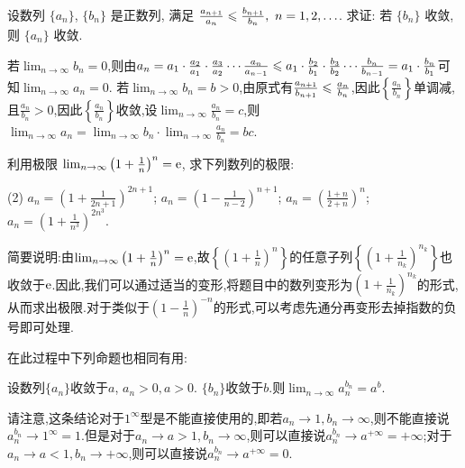 \begin{exercise}[1.2.21]
    设数列 $\{a_n\}$, $\{b_n\}$ 是正数列, 满足 $\frac{a_{n+1}}{a_n} \leqslant \frac{b_{n+1}}{b_n}, \ n=1, 2, \ldots$. 求证: 若 $\{b_n\}$ 收敛, 则 $\{a_n\}$ 收敛.
\end{exercise}

\begin{solution}
    若$\lim_{n\to\infty} b_n = 0$,则由$a_n = a_1 \cdot \frac{a_2}{a_1} \cdot \frac{a_3}{a_2} \cdots \frac{a_n}{a_{n-1}} \leqslant a_1 \cdot \frac{b_2}{b_1} \cdot \frac{b_3}{b_2} \cdots \frac{b_n}{b_{n-1}} = a_1 \cdot \frac{b_n}{b_1}$可知$\lim_{n\to\infty} a_n = 0$.
    若$\lim_{n\to\infty} b_n = b > 0$,由原式有$\frac{a_{n+1}}{b_{n+1}} \leqslant \frac{a_n}{b_n}$,因此$\left\{ \frac{a_n}{b_n} \right\}$单调减,且$\frac{a_n}{b_n} > 0$,因此$\left\{ \frac{a_n}{b_n} \right\}$收敛,设$\lim_{n\to\infty} \frac{a_n}{b_n} = c$,则$\lim_{n\to\infty} a_n = \lim_{n\to\infty} b_n \cdot \lim_{n\to\infty} \frac{a_n}{b_n} = bc$.
\end{solution}

\begin{exercise}[1.2.22]
    利用极限 $\lim_{n\to\infty} \left(1 + \frac{1}{n}\right)^n = \mathrm{e}$, 求下列数列的极限:
    \begin{tasks}[label=(\arabic*)](2)
        \task $a_n = \left(1 + \frac{1}{2n+1}\right)^{2n+1}$;
        \task $a_n = \left(1 - \frac{1}{n-2}\right)^{n+1}$;
        \task $a_n = \left(\frac{1+n}{2+n}\right)^{n}$;
        \task $a_n = \left(1 + \frac{1}{n^3}\right)^{2n^3}$.
    \end{tasks}
\end{exercise}

简要说明:由$\lim_{n\to\infty} \left(1 + \frac{1}{n}\right)^n = \mathrm{e}$,故$\left\{ \left(1 + \frac{1}{n}\right)^n \right\}$的任意子列$\left\{ \left(1 + \frac{1}{n_k}\right)^{n_k} \right\}$也收敛于$\mathrm{e}$.因此,我们可以通过适当的变形,将题目中的数列变形为$\left(1 + \frac{1}{n_k}\right)^{n_k}$的形式,从而求出极限.对于类似于$\left(1 - \frac{1}{n}\right)^{-n}$的形式,可以考虑先通分再变形去掉指数的负号即可处理.

在此过程中下列命题也相同有用:
\begin{proposition*}
    设数列$\{a_n\}$收敛于$a$, $a_n > 0, a > 0$. $\{b_n\}$收敛于$b$.则$\lim_{n \to \infty} a_n^{b_n} = a^b$.
\end{proposition*}
请注意,这条结论对于$1^ \infty$型是不能直接使用的,即若$a_n \to 1, b_n \to \infty$,则不能直接说$a_n^{b_n} \to 1^\infty = 1$.但是对于$a_n \to a > 1, b_n \to \infty$,则可以直接说$a_n^{b_n} \to a^{+ \infty} = + \infty$;对于$a_n \to a < 1, b_n \to + \infty$,则可以直接说$a_n^{b_n} \to a^{+ \infty} = 0$.

